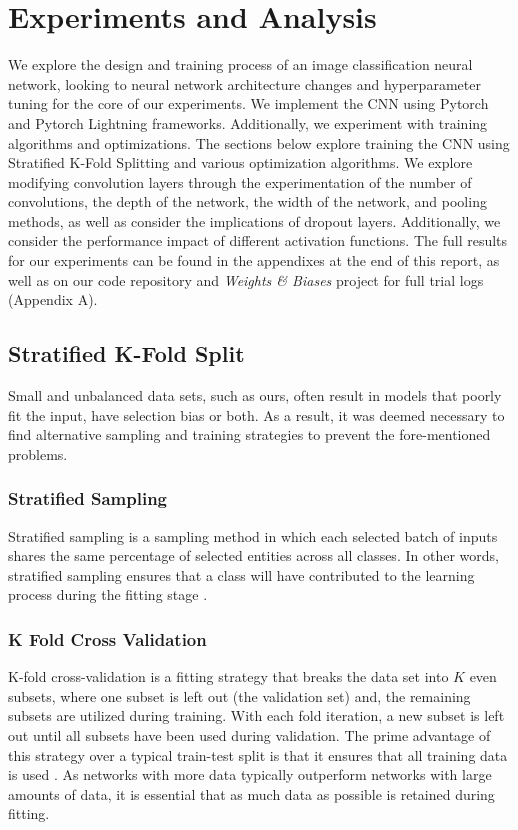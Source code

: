 \documentclass{article}
\begin{document}
\section{Experiments and Analysis}
 We explore the design and training process of an image classification neural network, looking to neural network architecture changes and hyperparameter tuning for the core of our experiments. We implement the CNN using Pytorch \cite{NEURIPS2019_9015} and Pytorch Lightning \cite{pytorch-lightning} frameworks. Additionally, we experiment with training algorithms and optimizations. The sections below explore training the CNN using Stratified K-Fold Splitting and various optimization algorithms. We explore modifying convolution layers through the experimentation of the number of convolutions, the depth of the network, the width of the network, and pooling methods, as well as consider the implications of dropout layers. Additionally, we consider the performance impact of different activation functions. The full results for our experiments can be found in the appendixes at the end of this report, as well as on our code repository and \emph{Weights \& Biases} \cite{wandb} project for full trial logs (Appendix A). 

\subsection{Stratified K-Fold Split}
Small and unbalanced data sets, such as ours, often result in models that poorly fit the input, have selection bias or both. As a result, it was deemed necessary to find alternative sampling and training strategies to prevent the fore-mentioned problems.

\subsubsection{Stratified Sampling}
Stratified sampling is a sampling method in which each selected batch of inputs shares the same percentage of selected entities across all classes. In other words, stratified sampling ensures that a class will have contributed to the learning process during the fitting stage \cite{scikit-learn}.

\subsubsection{K Fold Cross Validation}
K-fold cross-validation is a fitting strategy that breaks the data set into $K$ even subsets, where one subset is left out (the validation set) and, the remaining subsets are utilized during training. With each fold iteration, a new subset is left out until all subsets have been used during validation. The prime advantage of this strategy over a typical train-test split is that it ensures that all training data is used \cite{scikit-learn}. As networks with more data typically outperform networks with large amounts of data, it is essential that as much data as possible is retained during fitting.
\end{document}
